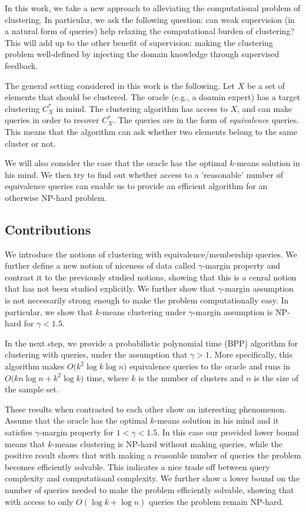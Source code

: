 \documentclass[orivec]{llncs}
\begin{document}
In this work, we take a new approach to alleviating the computational problem of clustering. In particular, we ask the following question: can weak supervision (in a natural form of queries) help relaxing the computational burden of clustering? This will add up to the other benefit of supervision: making the clustering problem well-defined by injecting the domain knowledge through supervised feedback.

The general setting considered in this work is the following. Let $X$ be a set of elements that should be clustered. The oracle (e.g., a doamin expert) has a target clustering $C^*_X$ in mind. The clustering algorithm has access to $X$, and can make queries in order to recover $C^*_X$. The queries are in the form of \emph{equivalence} queries. This means that the algorithm can ask whether two elements belong to the same cluster or not.

We will also consider the case that the oracle has the optimal $k$-means solution in his mind. We then try to find out whether access to a 'reasonable' number of equivalence queries can enable us to provide an efficient algorithm for an otherwise NP-hard problem. 

\subsection{Contributions}

We introduce the notions of clustering with equivalence/membership queries. We further define a new notion of niceness of data called $\gamma$-margin property and contrast it to the previously studied notions, showing that this is a cenral notion that has not been studied explicitly. We further show that $\gamma$-margin assumption is not necessarily strong enough to make the problem computationally easy. In particular, we show that $k$-means clustering under $\gamma$-margin assumption is NP-hard for $\gamma < 1.5$.

In the next step, we provide a probabilistic polynomial time (BPP) algorithm for clustering with queries, under the assumption that $\gamma > 1$. More specifically, this algorithm makes $O\big(k^2\log k\log n)$ equivalence queries to the oracle and runs in $O\big(kn\log n + k^2\log k)$ time, where $k$ is the number of clusters and $n$ is the size of the sample set.

These results when contrasted to each other show an interesting phenomenon. Assume that the oracle has the optimal $k$-means solution in his mind and it satisfies $\gamma$-margin property for $1<\gamma <1.5$. In this case our provided lower bound means that $k$-means clustering is NP-hard without making queries, while the positive result shows that with making a reasonble number of queries the problem becomes efficiently solvable. This indicates a nice trade off between query complexity and computatioanl complexity. We further show a lower bound on the number of queries needed to make the problem efficiently solvable, showing that with access to only $O(\log k + \log n)$ queries the problem remain NP-hard.
\end{document}
